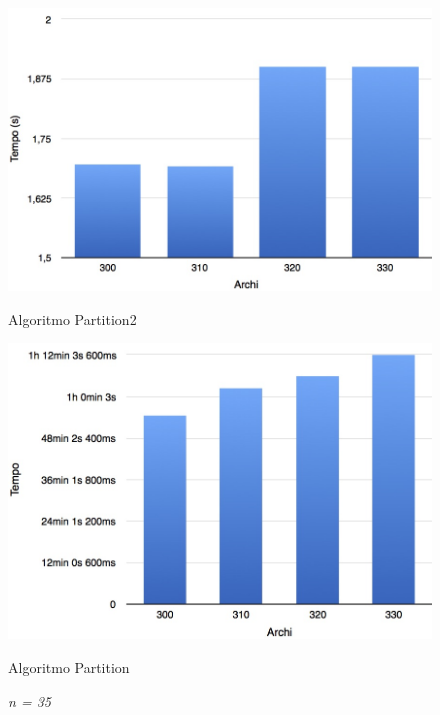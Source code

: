 \begin{figure}[h!]
	\vspace*{1cm}
	\begin{minipage}{0.40\textwidth}
		\centering
		\includegraphics[scale=.25]{img/beta4/35_4.jpg}
		\caption{Algoritmo Partition2}
	\end{minipage}\hfill
	\begin{minipage}{0.40\textwidth}
		\centering
		\includegraphics[scale=.25]{img/iole_beta4/iole_35_4.jpg}
		\caption{Algoritmo Partition}
	\end{minipage}
	\caption*{\textit{n = 35}}
\end{figure}
